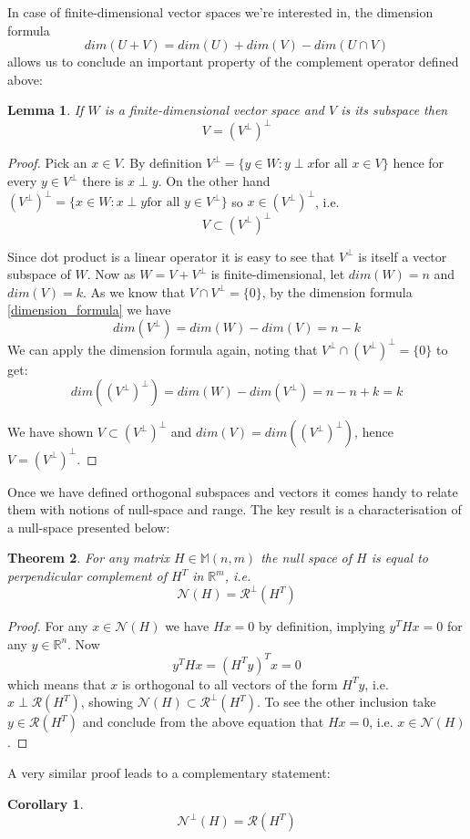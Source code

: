 \documentclass[a4paper]{article}
\theoremstyle{break}
\newtheorem{theorem}{Theorem}[section]
\newtheorem{corollary}{Corollary}[theorem]
\newtheorem{lemma}[theorem]{Lemma}
\newcommand{\R}{\mathbb{R}}
\newcommand{\Nu}{\mathcal{N}}
\newcommand{\Ra}{\mathcal{R}}
\newcommand{\Mat}[2]{\mathbb{M}(#1, #2)}
\begin{document}
In case of finite-dimensional vector spaces we're interested in, the dimension formula
\begin{equation}
    \label{dimension_formula}
    dim(U + V) = dim(U) + dim(V) - dim( U \cap V)
\end{equation}
allows us to conclude an important property of the complement operator defined above:

\begin{lemma}
    \label{lem:double_perp}
    If $W$ is a finite-dimensional vector space and $V$ is its subspace then
    $$ V = (V^\perp)^\perp $$
\end{lemma}

\begin{proof}
    Pick an $x \in V$. By definition $ V^\perp = \{ y \in W : y \perp x \text{for all } x \in V \}$ hence for every $y \in V^\perp $ there is $x \perp y$. On the other hand $ (V^\perp)^\perp = \{ x \in W : x \perp y \text{for all } y \in V^\perp \}$ so $x \in (V^\perp)^\perp$, i.e.
    $$ V \subset (V^\perp)^\perp$$

    Since dot product is a linear operator it is easy to see that $V^\perp$ is itself a vector subspace of $W$. Now as $W = V + V^\perp$ is finite-dimensional, let $dim(W) = n$ and $dim(V) = k$. As we know that $V \cap V^\perp = \{0\}$, by the dimension formula \eqref{dimension_formula} we have
    $$ dim(V^\perp) = dim(W) - dim(V) = n - k $$
    We can apply the dimension formula again, noting that $ V^\perp \cap (V^\perp)^\perp = \{0\} $ to get:
    $$ dim((V^\perp)^\perp) = dim(W) - dim(V^\perp) = n - n + k = k $$
    
    We have shown $ V \subset (V^\perp)^\perp$ and $ dim(V) = dim((V^\perp)^\perp)$,
    hence $ V = (V^\perp)^\perp$.
\end{proof}
Once we have defined orthogonal subspaces and vectors it comes handy to relate them with notions of null-space and range. The key result is a characterisation of a null-space presented below:


\begin{theorem} \label{thm:charact_nullspace}
    For any matrix $H \in \Mat{n}{m}$ the null space of $H$ is equal to perpendicular complement of $H^T$ in $\R^m$, i.e.
    $$\Nu(H) = \Ra^\perp(H^T)$$
\end{theorem}

\begin{proof}
    For any $x \in \Nu(H)$ we have $H x = 0$ by definition, implying $ y^T H x = 0$ for any $y \in \R^n$. Now
    $$  y^T H x = (H^T y )^T x = 0$$
    which means that $x$ is orthogonal to all vectors of the form $ H^T y $, i.e. $ x \perp \Ra(H^T)$, showing $ \Nu(H) \subset \Ra^\perp(H^T)$. To see the other inclusion take $ y \in \Ra(H^T) $ and conclude from the above equation that $ H x = 0$, i.e. $ x \in \Nu(H)$.
\end{proof}
A very similar proof leads to a complementary statement:
\begin{corollary} \label{cor:charact_range}
    $$\Nu^\perp(H) = \Ra(H^T)$$
\end{corollary}
\end{document}

